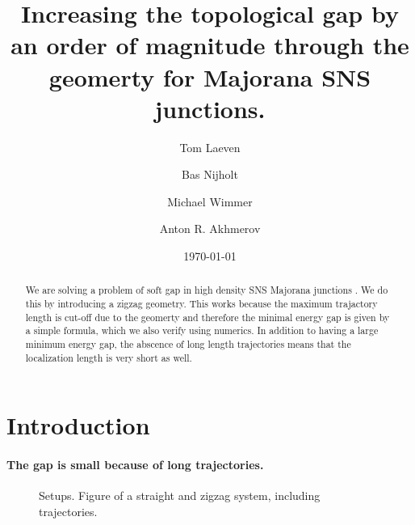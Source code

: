 \documentclass[english, twocolumn, 10pt, aps, superscriptaddress, floatfix, prb, citeautoscript]{revtex4-1}
\renewcommand{\comment}[2]{#2}
\renewcommand{\comment}{\paragraph}
\begin{document}
\title{Increasing the topological gap by an order of magnitude through the geomerty for Majorana SNS junctions.}

\author{Tom Laeven}

\author{Bas Nijholt}

\author{Michael Wimmer}

\author{Anton R. Akhmerov}

\date{\today}

\begin{abstract}
We are solving a problem of soft gap in high density SNS Majorana junctions \cite{pientka2017topological}.
We do this by introducing a zigzag geometry.
This works because the maximum trajactory length is cut-off due to the geomerty and therefore the minimal energy gap is given by a simple formula, which we also verify using numerics.
In addition to having a large minimum energy gap, the abscence of long length trajectories means that the localization length is very short as well.
\end{abstract}

\maketitle


\section{Introduction}

\comment{The gap is small because of long trajectories.}

\begin{figure}
\caption{Setups. Figure of a straight and zigzag system, including trajectories.
\label{fig:setup}}
\end{figure}
\end{document}
